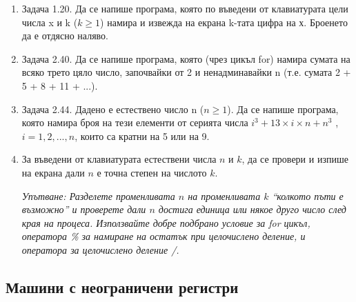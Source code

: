 \documentclass[12pt,a4paper]{article}
\begin{document}
\begin{enumerate}[resume]


	\item Задача 1.20.\cite{sbornik} Да се напише програма, която по въведени от клавиатурата цели числа x и k ($k \geq 1$) намира и извежда на екрана k-тата цифра на х. Броенето да е отдясно наляво.

	\item Задача 2.40.\cite{sbornik} Да се напише програма, която (чрез цикъл for) намира сумата на всяко трето цяло число, започвайки от 2 и ненадминавайки n (т.е. сумата 2 + 5 + 8 + 11 + ...).

	\item Задача 2.44.\cite{sbornik} Дадено е естествено число n ($n \geq 1$). Да се напише програма, която намира броя на тези елементи от серията числа $i^3 + 13 \times i \times n + n
	^3$ , $i = 1, 2, ..., n$, които са кратни на 5 или на 9.

	\item За въведени от клавиатурата естествени числа $n$ и $k$, да се провери и изпише на екрана дали $n$ е точна степен на числото $k$.

	\textit{Упътване: Разделете променливата $n$ на променливата $k$ ``колкото пъти е възможно'' и проверете дали $n$ достига единица или някое друго число след края на процеса. Използвайте добре подбрано условие за for цикъл, оператора \% за намиране на остатък при целочислено деление, и оператора за целочислено деление /.}

\end{enumerate}


\subsection {Машини с неограничени регистри}
\end{document}
